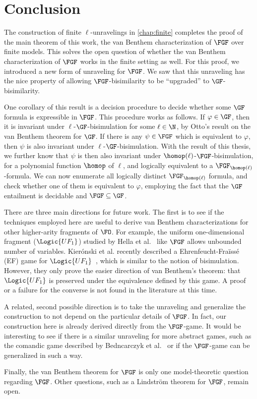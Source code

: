 \chapter{Conclusion}\label{chap:conclusion}
The construction of finite $\ell$-unravelings in \cref{chap:finite} completes the proof of the main theorem of this work, the van Benthem characterization of $\FGF$ over finite models.
This solves the open question of whether the van Benthem characterization of $\FGF$ works in the finite setting as well.
For this proof, we introduced a new form of unraveling for $\FGF$.
We saw that this unraveling has the nice property of allowing $\FGF$-bisimilarity to be ``upgraded'' to $\GF$-bisimilarity.

One corollary of this result is a decision procedure to decide whether some $\GF$ formula is expressible in $\FGF$.
This procedure works as follows.
If $\varphi \in \GF$, then it is invariant under $\ell$-$\GF$-bisimulation for some $\ell \in \N$, by Otto's result on the van Benthem theorem for $\GF$.
If there is any $\psi \in \FGF$ which is equivalent to $\varphi$, then $\psi$ is also invariant under $\ell$-$\GF$-bisimulation.
With the result of this thesis, we further know that $\psi$ is then also invariant under $\homop(\ell)$-$\FGF$-bisimulation, for a polynomial function $\homop$ of $\ell$, and logically equivalent to a $\FGF_{\homop(\ell)}$-formula.
We can now enumerate all logically distinct $\FGF_{\homop(\ell)}$ formula, and check whether one of them is equivalent to $\varphi$, employing the fact that the $\GF$ entailment is decidable and $\FGF \subseteq \GF$.

There are three main directions for future work.
The first is to see if the techniques employed here are useful to derive van Benthem characterizations for other higher-arity fragments of $\FO$.
For example, the uniform one-dimensional fragment ($\Logic{UF_{1}}$) studied by Hella et al.~\cite{hella2014} like $\FGF$ allows unbounded number of variables.
Kierónski et al. recently described a Ehrenfeucht-Fraïssé (EF) game for $\Logic{UF_{1}}$~\cite{kieronski2015}, which is similar to the notion of bisimulation.
However, they only prove the easier direction of van Benthem's theorem: that $\Logic{UF_{1}}$  is preserved under the equivalence defined by this game.
A proof or a failure for the converse is not found in the literature at this time.

A related, second possible direction is to take the unraveling and generalize the construction to not depend on the particular details of $\FGF$.
In fact, our construction here is already derived directly from the $\FGF$-game.
It would be interesting to see if there is a similar unraveling for more abstract games, such as the comandic game described by Bedncarczyk et al.~\cite{bednarczyk2022a} or if the $\FGF$-game can be generalized in such a way.

Finally, the van Benthem theorem for $\FGF$ is only one model-theoretic question regarding $\FGF$.
Other questions, such as a Lindström theorem for $\FGF$, remain open.
